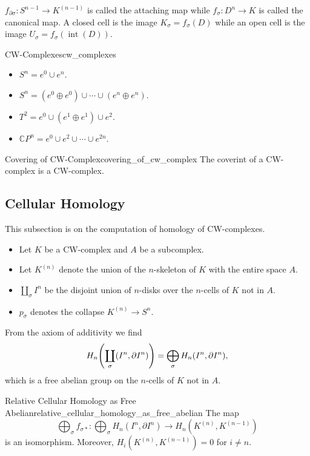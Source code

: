 \documentclass{article}
\begin{document}
$f_{\partial \sigma}: S^{n-1} \rightarrow K^{(n-1)}$ is called the attaching map while $f_\sigma: D^n \rightarrow K$ is called the canonical map.
A closed cell is the image $K_\sigma = f_\sigma(D)$ while an open cell is the image $U_\sigma = f_\sigma(\operatorname{int}(D))$.

\begin{example}{CW-Complexes}{cw_complexes}
    \begin{itemize}
        \item $S^n = e^0 \cup e^n$.
        \item $S^n = (e^0 \oplus e^0) \cup \cdots \cup (e^n \oplus e^n)$.
        \item $T^2 = e^0 \cup (e^1 \oplus e^1) \cup e^2$.
        \item $\mathbb{C}P^n = e^0 \cup e^2 \cup \cdots \cup e^{2n}$.
    \end{itemize}
\end{example}

\begin{theorem}{Covering of CW-Complex}{covering_of_cw_complex}
    The coverint of a CW-complex is a CW-complex.
\end{theorem}

\subsection{Cellular Homology}

This subsection is on the computation of homology of CW-complexes.
\begin{itemize}
    \item Let $K$ be a CW-complex and $A$ be a subcomplex.
    \item Let $K^{(n)}$ denote the union of the $n$-skeleton of $K$ with the entire space $A$.
    \item $\coprod_\sigma I^n$ be the disjoint union of $n$-disks over the $n$-cells of $K$ not in $A$.
    \item $p_\sigma$ denotes the collapse $K^{(n )} \rightarrow S^n$.
\end{itemize}
From the axiom of additivity we find
\[ H_n\qty(\coprod_\sigma (I^n,\partial I^n)) = \bigoplus_\sigma H_n(I^n,\partial I^n), \]
which is a free abelian group on the $n$-cells of $K$ not in $A$.

\begin{lemma}{Relative Cellular Homology as Free Abelian}{relative_cellular_homology_as_free_abelian}
    The map
    \[ \bigoplus_\sigma f_{\sigma *}: \bigoplus_\sigma H_n(I^n,\partial I^n) \rightarrow H_n(K^{(n)}, K^{(n-1)}) \]
    is an isomorphism.
    Moreover, $H_i(K^{(n)}, K^{(n-1)}) = 0$ for $i\neq n$.
\end{lemma}
\end{document}
